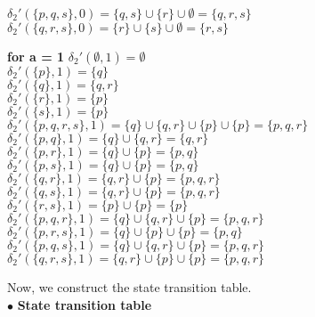 \documentclass{report}
\begin{document}
{\begin{minipage}[t]{0.5\textwidth}
            $\delta_{2}'(\{ p,q,s \},0) = \{ q,s \} \cup \{ r \} \cup \emptyset = \{ q,r,s \}$\\
            $\delta_{2}'(\{ q,r,s \},0) = \{ r \} \cup \{ s \} \cup \emptyset = \{ r,s \}$\\
\end{minipage}%
\hfill
\begin{minipage}[t]{0.48\textwidth}
      \textbf{for a = 1}\newline
            $\delta_{2}'(\emptyset,1) = \emptyset$\\
            $\delta_{2}'(\{ p \},1) = \{ q \}$\\
            $\delta_{2}'(\{ q \},1) = \{ q,r \}$\\
            $\delta_{2}'(\{ r \},1) = \{ p \}$\\
            $\delta_{2}'(\{ s \},1) = \{ p \}$\\
            $\delta_{2}'(\{ p,q,r,s \},1) = \{ q \} \cup \{ q,r \} \cup \{ p \} \cup \{ p \} = \{ p,q,r \}$\\
            $\delta_{2}'(\{ p,q \},1) = \{ q \} \cup \{ q,r \} = \{ q,r \}$\\
            $\delta_{2}'(\{ p,r \},1) = \{ q \} \cup \{ p \} = \{ p,q \}$\\
            $\delta_{2}'(\{ p,s \},1) = \{ q \} \cup \{ p \} = \{ p,q \}$\\
            $\delta_{2}'(\{ q,r \},1) = \{ q,r \} \cup \{ p \} = \{ p,q,r \}$\\
            $\delta_{2}'(\{ q,s \},1) = \{ q,r \} \cup \{ p \} = \{ p,q,r \}$\\
            $\delta_{2}'(\{ r,s \},1) = \{ p \} \cup \{ p \} = \{ p \}$\\
            $\delta_{2}'(\{ p,q,r \},1) = \{ q \} \cup \{ q,r \} \cup \{ p \} = \{ p,q,r \}$\\
            $\delta_{2}'(\{ p,r,s \},1) = \{ q \} \cup \{ p \} \cup \{ p \} = \{ p,q \}$\\
            $\delta_{2}'(\{ p,q,s \},1) = \{ q \} \cup \{ q,r \} \cup \{ p \} = \{ p,q,r \}$\\
            $\delta_{2}'(\{ q,r,s \},1) = \{ q,r \} \cup \{ p \} \cup \{ p \} = \{ p,q,r \}$\\
\end{minipage}
Now, we construct the state transition table.\\
$\bullet$ \textbf{State transition table} \newline
\begin{center}\

\end{center}}
\end{document}
